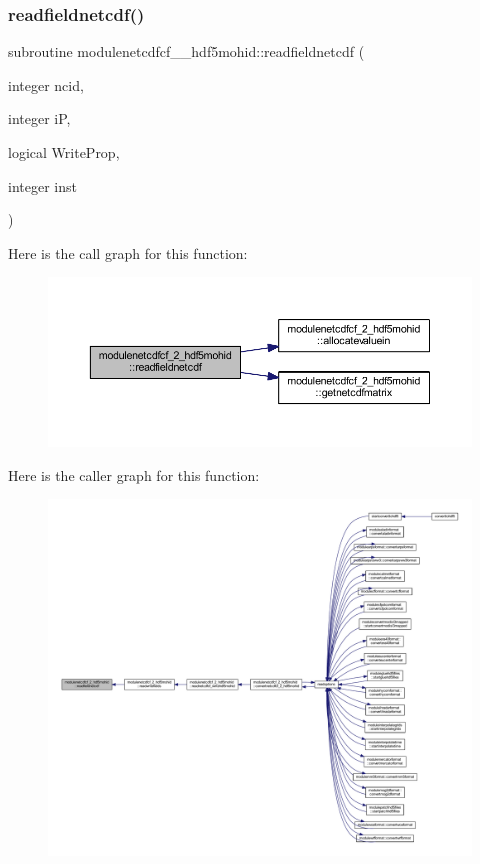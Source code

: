 \subsubsection{\texorpdfstring{readfieldnetcdf()}{readfieldnetcdf()}}
{\footnotesize\ttfamily subroutine modulenetcdfcf\+\_\+\_\+hdf5mohid\+::readfieldnetcdf (\begin{DoxyParamCaption}\item[{integer}]{ncid,  }\item[{integer}]{iP,  }\item[{logical}]{Write\+Prop,  }\item[{integer}]{inst }\end{DoxyParamCaption})\hspace{0.3cm}{\ttfamily [private]}}

Here is the call graph for this function\+:\nopagebreak
\begin{figure}[H]
\begin{center}
\leavevmode
\includegraphics[width=350pt]{namespacemodulenetcdfcf__2__hdf5mohid_ac66f8e687cb8a5fe1cb48f9f02300915_cgraph}
\end{center}
\end{figure}
Here is the caller graph for this function\+:\nopagebreak
\begin{figure}[H]
\begin{center}
\leavevmode
\includegraphics[width=350pt]{namespacemodulenetcdfcf__2__hdf5mohid_ac66f8e687cb8a5fe1cb48f9f02300915_icgraph}
\end{center}
\end{figure}
